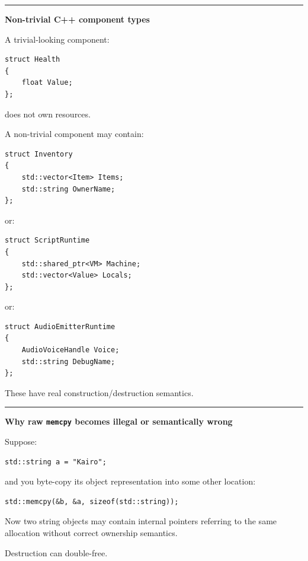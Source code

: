 \begin{center}\rule{0.5\linewidth}{0.5pt}\end{center}

\textbf{Non-trivial C++ component types}

A trivial-looking component:

\begin{verbatim}
struct Health
{
    float Value;
};
\end{verbatim}

does not own resources.

A non-trivial component may contain:

\begin{verbatim}
struct Inventory
{
    std::vector<Item> Items;
    std::string OwnerName;
};
\end{verbatim}

or:

\begin{verbatim}
struct ScriptRuntime
{
    std::shared_ptr<VM> Machine;
    std::vector<Value> Locals;
};
\end{verbatim}

or:

\begin{verbatim}
struct AudioEmitterRuntime
{
    AudioVoiceHandle Voice;
    std::string DebugName;
};
\end{verbatim}

These have real construction/destruction semantics.

\begin{center}\rule{0.5\linewidth}{0.5pt}\end{center}

\textbf{Why raw \texttt{memcpy} becomes illegal or semantically wrong}

Suppose:

\begin{verbatim}
std::string a = "Kairo";
\end{verbatim}

and you byte-copy its object representation into some other location:

\begin{verbatim}
std::memcpy(&b, &a, sizeof(std::string));
\end{verbatim}

Now two string objects may contain internal pointers referring to the same allocation without correct ownership semantics.

Destruction can double-free.

